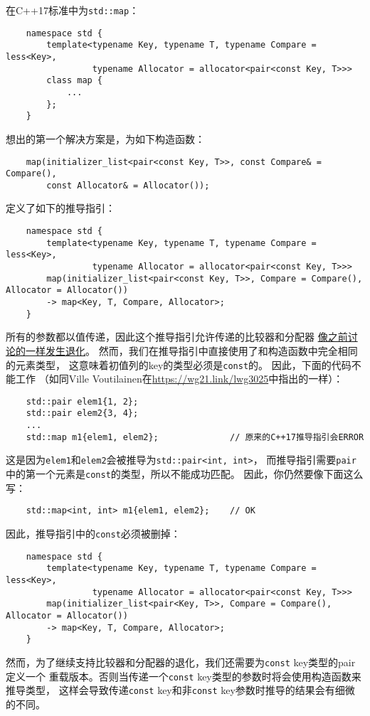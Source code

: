 在C++17标准中为\texttt{std::map}：
\begin{lstlisting}
    namespace std {
        template<typename Key, typename T, typename Compare = less<Key>,
                 typename Allocator = allocator<pair<const Key, T>>>
        class map {
            ...
        };
    }
\end{lstlisting}
想出的第一个解决方案是，为如下构造函数：
\begin{lstlisting}
    map(initializer_list<pair<const Key, T>>, const Compare& = Compare(),
        const Allocator& = Allocator());
\end{lstlisting}
定义了如下的推导指引：
\begin{lstlisting}
    namespace std {
        template<typename Key, typename T, typename Compare = less<Key>,
                 typename Allocator = allocator<pair<const Key, T>>>
        map(initializer_list<pair<const Key, T>>, Compare = Compare(), Allocator = Allocator())
        -> map<Key, T, Compare, Allocator>;
    }
\end{lstlisting}
所有的参数都以值传递，因此这个推导指引允许传递的比较器和分配器
\hyperref[ch9.2.1]{像之前讨论的一样发生退化}。
然而，我们在推导指引中直接使用了和构造函数中完全相同的元素类型，
这意味着初值列的key的类型必须是\texttt{const}的。
因此，下面的代码不能工作
（如同Ville Voutilainen在\url{https://wg21.link/lwg3025}中指出的一样）：
\begin{lstlisting}
    std::pair elem1{1, 2};
    std::pair elem2{3, 4};
    ...
    std::map m1{elem1, elem2};              // 原来的C++17推导指引会ERROR
\end{lstlisting}
这是因为\texttt{elem1}和\texttt{elem2}会被推导为\texttt{std::pair<int, int>}，
而推导指引需要\texttt{pair}中的第一个元素是\texttt{const}的类型，所以不能成功匹配。
因此，你仍然要像下面这么写：
\begin{lstlisting}
    std::map<int, int> m1{elem1, elem2};    // OK
\end{lstlisting}
因此，推导指引中的\texttt{const}必须被删掉：
\begin{lstlisting}
    namespace std {
        template<typename Key, typename T, typename Compare = less<Key>,
                 typename Allocator = allocator<pair<const Key, T>>>
        map(initializer_list<pair<Key, T>>, Compare = Compare(), Allocator = Allocator())
        -> map<Key, T, Compare, Allocator>;
    }
\end{lstlisting}
然而，为了继续支持比较器和分配器的退化，我们还需要为\texttt{const} key类型的pair定义一个
重载版本。否则当传递一个\texttt{const} key类型的参数时将会使用构造函数来推导类型，
这样会导致传递\texttt{const} key和非\texttt{const} key参数时推导的结果会有细微的不同。


